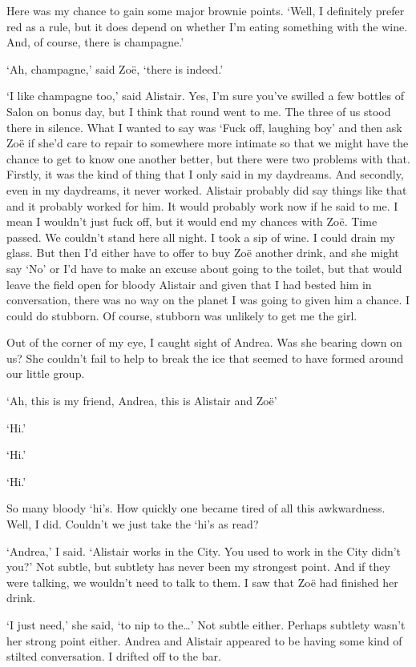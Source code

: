Here was my chance to gain some major brownie points. `Well, I
definitely prefer red as a rule, but it does depend on whether I'm
eating something with the wine. And, of course, there is champagne.'

`Ah, champagne,' said Zo{\"e}, `there is indeed.'

`I like champagne too,' said Alistair. Yes, I'm sure you've swilled
a few bottles of Salon on bonus day, but I think that round went to
me. The three of us stood there in silence. What I wanted to say was
`Fuck off, laughing boy' and then ask Zo{\"e} if she'd care to
repair to somewhere more intimate so that we might have the chance
to get to know one another better, but there were two problems with
that. Firstly, it was the kind of thing that I only said in my
daydreams. And secondly, even in my daydreams, it never worked.
Alistair probably did say things like that and it probably worked
for him. It would probably work now if he said to me. I mean I wouldn't just fuck off, but it would end my chances with Zo{\"e}.
Time passed. We couldn't stand here all night. I took a sip
of wine. I could drain my glass. But then I'd either have to offer
to buy Zo{\"e} another drink, and she might say `No' or I'd have to
make an excuse about going to the toilet, but that would leave the
field open for bloody Alistair and given that I had bested him in
conversation, there was no way on the planet I was going to given
him a chance. I could do stubborn. Of course, stubborn was unlikely
to get me the girl.

Out of the corner of my eye, I caught sight of Andrea. Was she
bearing down on us? She couldn't fail to help to break the ice that
seemed to have formed around our little group.

`Ah, this is my friend, Andrea, this is Alistair and Zo{\"e}'

`Hi.'

`Hi.'

`Hi.'

So many bloody `hi's. How quickly one became tired of all this
awkwardness. Well, I did. Couldn't we just take the `hi's as read?

`Andrea,' I said. `Alistair works in the City. You used to work in
the City didn't you?' Not subtle, but subtlety has never been my
strongest point. And if they were talking, we wouldn't need to talk to
them. I saw that Zo{\"e} had finished her drink.

`I just need,' she said, `to nip to the\dots' Not subtle either.
Perhaps subtlety wasn't her strong point either. Andrea and Alistair
appeared to be having some kind of stilted conversation. I drifted
off to the bar.

